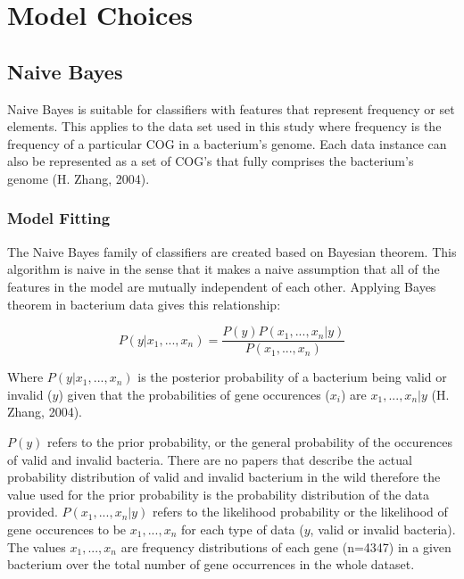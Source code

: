 \documentclass[]{report}
\begin{document}
\section{Model Choices}\label{model-choices}

\subsection{Naive Bayes}\label{naive-bayes}

Naive Bayes is suitable for classifiers with features that represent
frequency or set elements. This applies to the data set used in this
study where frequency is the frequency of a particular COG in a
bacterium's genome. Each data instance can also be represented as a set
of COG's that fully comprises the bacterium's genome (H. Zhang, 2004).

\subsubsection{Model Fitting}\label{model-fitting}

The Naive Bayes family of classifiers are created based on Bayesian
theorem. This algorithm is naive in the sense that it makes a naive
assumption that all of the features in the model are mutually
independent of each other. Applying Bayes theorem in bacterium data
gives this relationship:

\begin{equation} P(y|x_{1},...,x_{n}) = \frac{P(y)P(x_{1},...,x_{n}|y)}{P(x_{1},...,x_{n})}  \end{equation}

Where \(P(y|x_{1},...,x_{n})\) is the posterior probability of a
bacterium being valid or invalid (\(y\)) given that the probabilities of
gene occurences (\(x_i\)) are \(x_{1},...,x_{n}|y\) (H. Zhang, 2004).

\(P(y)\) refers to the prior probability, or the general probability of
the occurences of valid and invalid bacteria. There are no papers that
describe the actual probability distribution of valid and invalid
bacterium in the wild therefore the value used for the prior probability
is the probability distribution of the data provided.
\(P(x_{1},...,x_{n}|y)\) refers to the likelihood probability or the
likelihood of gene occurences to be \(x_{1},...,x_{n}\) for each type of
data (\(y\), valid or invalid bacteria). The values \(x_{1},...,x_{n}\)
are frequency distributions of each gene (n=4347) in a given bacterium
over the total number of gene occurrences in the whole dataset.
\end{document}
